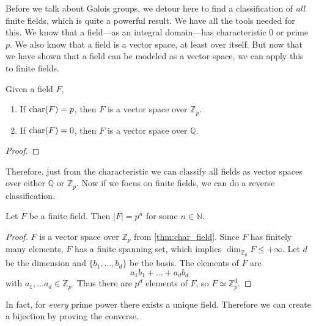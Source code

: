   Before we talk about Galois groups, we detour here to find a classification of \textit{all} finite fields, which is quite a powerful result. We have all the tools needed for this. We know that a field---as an integral domain---has characteristic $0$ or prime $p$. We also know that a field is a vector space, at least over itself. But now that we have shown that a field can be modeled as a vector space, we can apply this to finite fields. 

  \begin{theorem}
    \label{thm:char_field}
    Given a field $F$, 
    \begin{enumerate}
      \item If $\Char(F) = p$, then $F$ is a vector space over $\mathbb{Z}_p$. 
      \item If $\Char(F) = 0$, then $F$ is a vector space over $\mathbb{Q}$. 
    \end{enumerate}
  \end{theorem}
  \begin{proof}
    
  \end{proof} 

  Therefore, just from the characteristic we can classify all fields as vector spaces over either $\mathbb{Q}$ or $\mathbb{Z}_p$. Now if we focus on finite fields, we can do a reverse classification. 

  \begin{theorem}
    Let $F$ be a finite field. Then $|F| = p^n$ for some $n \in \mathbb{N}$. 
  \end{theorem}
  \begin{proof}
    $F$ is a vector space over $\mathbb{Z}_p$ from \ref{thm:char_field}. Since $F$ has finitely many elements, $F$ has a finite spanning set, which implies $\dim_{\mathbb{Z}_p} F \leq + \infty$. Let $d$ be the dimension and $\{b_1, \ldots, b_d\}$ be the basis. The elements of $F$ are 
    \begin{equation}
      a_1 b_1 + \ldots + a_d b_d
    \end{equation}
    with $a_1, \ldots a_d \in \mathbb{Z}_p$. Thus there are $p^d$ elements of $F$, so $F \simeq \mathbb{Z}_p^d$. 
  \end{proof}

  In fact, for \textit{every} prime power there exists a unique field. Therefore we can create a bijection by proving the converse. 

